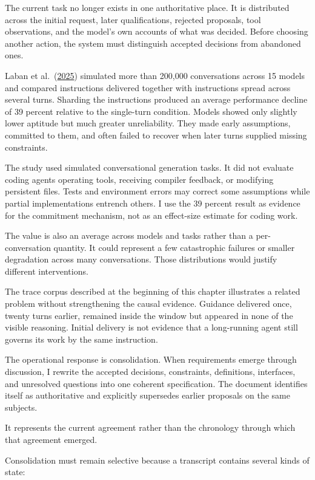 The current task no longer exists in one authoritative place. It is distributed across the initial request, later qualifications, rejected proposals, tool observations, and the model's own accounts of what was decided. Before choosing another action, the system must distinguish accepted decisions from abandoned ones.

Laban et al.~(\href{https://arxiv.org/abs/2505.06120}{2025}) simulated more than 200,000 conversations across 15 models and compared instructions delivered together with instructions spread across several turns. Sharding the instructions produced an average performance decline of 39 percent relative to the single-turn condition. Models showed only slightly lower aptitude but much greater unreliability. They made early assumptions, committed to them, and often failed to recover when later turns supplied missing constraints.

The study used simulated conversational generation tasks. It did not evaluate coding agents operating tools, receiving compiler feedback, or modifying persistent files. Tests and environment errors may correct some assumptions while partial implementations entrench others. I use the 39 percent result as evidence for the commitment mechanism, not as an effect-size estimate for coding work.

The value is also an average across models and tasks rather than a per-conversation quantity. It could represent a few catastrophic failures or smaller degradation across many conversations. Those distributions would justify different interventions.

The trace corpus described at the beginning of this chapter illustrates a related problem without strengthening the causal evidence. Guidance delivered once, twenty turns earlier, remained inside the window but appeared in none of the visible reasoning. Initial delivery is not evidence that a long-running agent still governs its work by the same instruction.

The operational response is consolidation. When requirements emerge through discussion, I rewrite the accepted decisions, constraints, definitions, interfaces, and unresolved questions into one coherent specification. The document identifies itself as authoritative and explicitly supersedes earlier proposals on the same subjects.

It represents the current agreement rather than the chronology through which that agreement emerged.

Consolidation must remain selective because a transcript contains several kinds of state:

